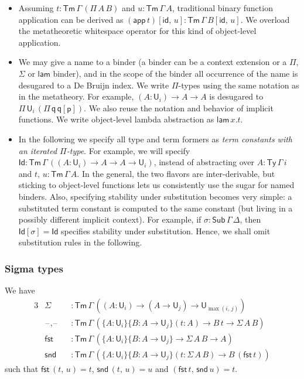 \documentclass[acmsmall,screen,review,anonymous]{acmart}
\newcommand{\msf}[1]{{\mathsf{#1}}}
\newcommand{\p}{\mathsf{p}}
\newcommand{\q}{\mathsf{q}}
\newcommand{\U}{\msf{U}}
\newcommand{\blank}{{\mathord{\hspace{1pt}\text{--}\hspace{1pt}}}}
\newcommand{\fst}{\msf{fst}}
\newcommand{\snd}{\msf{snd}}
\newcommand{\id}{\msf{id}}
\newcommand{\Sub}{\msf{Sub}}
\newcommand{\Ty}{\msf{Ty}}
\newcommand{\Tm}{\msf{Tm}}
\newcommand{\lam}{\msf{lam}}
\newcommand{\app}{\msf{app}}
\newcommand{\Id}{\msf{Id}}
\begin{document}
\begin{itemize}
\item Assuming $t : \Tm\,\Gamma\,(\Pi\,A\,B)$ and $u : \Tm\,\Gamma\,A$, traditional binary function
  application can be derived as $(\app\,t)[\id,\,u] : \Tm\,\Gamma\,B[\id,\,u]$. We overload the
  metatheoretic whitespace operator for this kind of object-level application.
\item We may give a name to a binder (a binder can be a context extension or a $\Pi$, $\Sigma$ or
  $\lam$ binder), and in the scope of the binder all occurrence of the name is desugared to a De
  Bruijn index.  We write $\Pi$-types using the same notation as in the metatheory. For example, $(A
  : \U_i) \to A \to A$ is desugared to $\Pi\,\U_i\,(\Pi\,\q\,\q[\p])$. We also reuse the notation
  and behavior of implicit functions. We write object-level lambda abstraction as $\lam\,x.t$.
\item
  In the following we specify all type and term formers as \emph{term constants with an iterated
  $\Pi$-type}.  For example, we will specify $\Id : \Tm\,\Gamma\,((A : \U_i) \to A \to A \to \U_i)$,
  instead of abstracting over $A : \Ty\,\Gamma\,i$ and $t,\,u : \Tm\,\Gamma\,A$. In the general, the
  two flavors are inter-derivable, but sticking to object-level functions lets us consistently use
  the sugar for named binders. Also, specifying stability under substitution becomes very simple: a
  substituted term constant is computed to the same constant (but living in a possibly different
  implicit context). For example, if $\sigma : \Sub\,\Gamma\,\Delta$, then $\Id[\sigma] = \Id$ specifies
  stability under substitution. Hence, we shall omit substitution rules in the following.
\end{itemize}

\subsubsection{Sigma types} We have
\begin{alignat*}{3}
  &\Sigma        &&: \Tm\,\Gamma\,((A : \U_i) \to (A \to \U_j) \to \U_{\max(i,\,j)}) \\
  &\blank,\blank &&: \Tm\,\Gamma\,(\{A : \U_i\}\{B : A \to \U_j\}(t : A) \to B\,t \to \Sigma\,A\,B)\\
  &\fst          &&: \Tm\,\Gamma\,(\{A : \U_i\}\{B : A \to \U_j\} \to \Sigma\,A\,B \to A)\\
  &\snd          &&: \Tm\,\Gamma\,(\{A : \U_i\}\{B : A \to \U_j\}(t : \Sigma\,A\,B) \to B\,(\fst\,t))
\end{alignat*}
such that $\fst\,(t,\,u) = t$, $\snd\,(t,\,u) = u$ and $(\fst\,t,\,\snd\,u) = t$.
\end{document}
